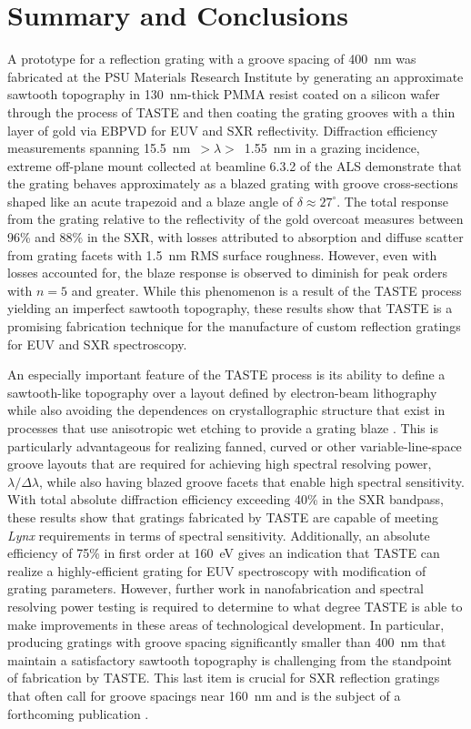 \documentclass{aastex63}
\begin{document}
\section{Summary and Conclusions}\label{sec:summary}
A prototype for a reflection grating with a groove spacing of 400~nm was fabricated at the PSU Materials Research Institute by generating an approximate sawtooth topography in 130~nm-thick PMMA resist coated on a silicon wafer through the process of TASTE and then coating the grating grooves with a thin layer of gold via EBPVD for EUV and SXR reflectivity. 
Diffraction efficiency measurements spanning 15.5~nm~$> \lambda >$~1.55~nm in a grazing incidence, extreme off-plane mount collected at beamline 6.3.2 of the ALS demonstrate that the grating behaves approximately as a blazed grating with groove cross-sections shaped like an acute trapezoid and a blaze angle of $\delta \approx 27^{\circ}$. 
The total response from the grating relative to the reflectivity of the gold overcoat measures between 96\% and 88\% in the SXR, with losses attributed to absorption and diffuse scatter from grating facets with 1.5~nm RMS surface roughness. 
However, even with losses accounted for, the blaze response is observed to diminish for peak orders with $n=5$ and greater. 
While this phenomenon is a result of the TASTE process yielding an imperfect sawtooth topography, these results show that TASTE is a promising fabrication technique for the manufacture of custom reflection gratings for EUV and SXR spectroscopy.

An especially important feature of the TASTE process is its ability to define a sawtooth-like topography over a layout defined by electron-beam lithography while also avoiding the dependences on crystallographic structure that exist in processes that use anisotropic wet etching to provide a grating blaze \citep{Franke97,Chang03,McEntaffer13,Miles18}. 
This is particularly advantageous for realizing fanned, curved or other variable-line-space groove layouts that are required for achieving high spectral resolving power, $\lambda / \Delta \lambda$, while also having blazed groove facets that enable high spectral sensitivity. %
With total absolute diffraction efficiency exceeding 40\% in the SXR bandpass, these results show that gratings fabricated by TASTE are capable of meeting \emph{Lynx} requirements in terms of spectral sensitivity. 
Additionally, an absolute efficiency of 75\% in first order at 160~eV gives an indication that TASTE can realize a highly-efficient grating for EUV spectroscopy with modification of grating parameters. 
However, further work in nanofabrication and spectral resolving power testing is required to determine to what degree TASTE is able to make improvements in these areas of technological development. 
In particular, producing gratings with groove spacing significantly smaller than 400~nm that maintain a satisfactory sawtooth topography is challenging from the standpoint of fabrication by TASTE. 
This last item is crucial for SXR reflection gratings that often call for groove spacings near 160~nm and is the subject of a forthcoming publication \citep{McCurdy19}. 
\end{document}
